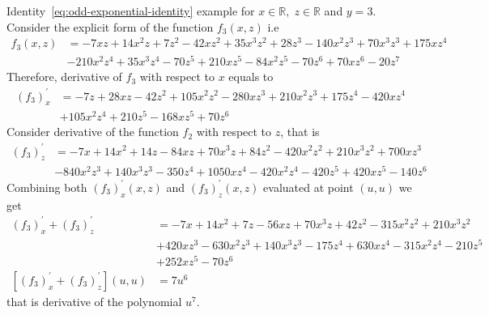 \begin{example}
    \normalfont
    Identity~\eqref{eq:odd-exponential-identity} example for $x\in\mathbb{R}, \; z\in \mathbb{R}$ and $y=3$.
    Consider the explicit form of the function $f_{3} (x, z)$ i.e
    \begin{align*}
        f_3 (x, z) &= -7 x z + 14 x^2 z + 7 z^2 - 42 x z^2 + 35 x^3 z^2 + 28 z^3 -140 x^2 z^3 + 70 x^3 z^3 + 175 x z^4 \\
        &- 210 x^2 z^4 + 35 x^3 z^4 -70 z^5 + 210 x z^5 - 84 x^2 z^5 - 70 z^6 + 70 x z^6 - 20 z^7
    \end{align*}
    Therefore, derivative of $f_{3}$ with respect to $x$ equals to
    \begin{align*}
    (f_3)
        ^{'}_{x} &= -7 z + 28 x z - 42 z^2 + 105 x^2 z^2 - 280 x z^3 + 210 x^2 z^3 + 175 z^4 - 420 x z^4 \\
        &+ 105 x^2 z^4 + 210 z^5 - 168 x z^5 + 70 z^6
    \end{align*}
    Consider derivative of the function $f_2$ with respect to $z$, that is
    \begin{align*}
    (f_3)
        ^{'}_{z} &= -7 x + 14 x^2 + 14 z - 84 x z + 70 x^3 z + 84 z^2 - 420 x^2 z^2 + 210 x^3 z^2 + 700 x z^3 \\
        &- 840 x^2 z^3 + 140 x^3 z^3 - 350 z^4 + 1050 x z^4 - 420 x^2 z^4 - 420 z^5 + 420 x z^5 - 140 z^6
    \end{align*}
    Combining both $(f_3)^{'}_{x} (x, z)$ and $(f_3)^{'}_{z} (x, z)$ evaluated at point $(u, u)$ we get
    \begin{align*}
    (f_3)
        ^{'}_{x} + (f_3)^{'}_{z} &= -7 x + 14 x^2 + 7 z - 56 x z + 70 x^3 z + 42 z^2 - 315 x^2 z^2 + 210 x^3 z^2 \\
        &+ 420 x z^3 - 630 x^2 z^3 + 140 x^3 z^3 - 175 z^4 + 630 x z^4 - 315 x^2 z^4 - 210 z^5 \\
        &+ 252 x z^5 - 70 z^6 \\
        [(f_3) ^{'}_{x} + (f_3)^{'}_{z}] (u,u) &= 7 u^6
    \end{align*}
    that is derivative of the polynomial $u^7$.
\end{example}